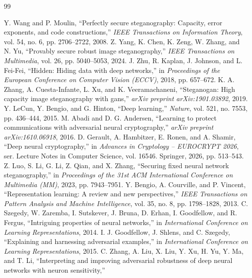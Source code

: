 \documentclass[UTF8,a4paper,zihao=-4,fontset=windows,openany]{ctexbook}
\begin{document}
\begin{thebibliography}{99}
Y. Wang and P. Moulin,
``Perfectly secure steganography: Capacity, error exponents, and code constructions,''
\emph{IEEE Transactions on Information Theory},
vol. 54, no. 6, pp. 2706--2722, 2008.
Z. Yang, K. Chen, K. Zeng, W. Zhang, and N. Yu,
``Provably secure robust image steganography,''
\emph{IEEE Transactions on Multimedia},
vol. 26, pp. 5040--5053, 2024.
J. Zhu, R. Kaplan, J. Johnson, and L. Fei-Fei,
``Hidden: Hiding data with deep networks,''
in \emph{Proceedings of the European Conference on Computer Vision (ECCV)},
2018, pp. 657--672.
K. A. Zhang, A. Cuesta-Infante, L. Xu, and K. Veeramachaneni,
``Steganogan: High capacity image steganography with gans,''
\emph{arXiv preprint arXiv:1901.03892}, 2019.
Y. LeCun, Y. Bengio, and G. Hinton,
``Deep learning,''
\emph{Nature}, vol. 521, no. 7553, pp. 436--444, 2015.
M. Abadi and D. G. Andersen,
``Learning to protect communications with adversarial neural cryptography,''
\emph{arXiv preprint arXiv:1610.06918}, 2016.
D. Gerault, A. Hambitzer, E. Ronen, and A. Shamir,
``Deep neural cryptography,''
in \emph{Advances in Cryptology -- EUROCRYPT 2026},
ser. Lecture Notes in Computer Science, vol. 16546.
Springer, 2026, pp. 513--543.
Z. Luo, S. Li, G. Li, Z. Qian, and X. Zhang,
``Securing fixed neural network steganography,''
in \emph{Proceedings of the 31st ACM International Conference on Multimedia (MM)},
2023, pp. 7943--7951.
Y. Bengio, A. Courville, and P. Vincent,
``Representation learning: A review and new perspectives,''
\emph{IEEE Transactions on Pattern Analysis and Machine Intelligence},
vol. 35, no. 8, pp. 1798--1828, 2013.
C. Szegedy, W. Zaremba, I. Sutskever, J. Bruna, D. Erhan,
I. Goodfellow, and R. Fergus,
``Intriguing properties of neural networks,''
in \emph{International Conference on Learning Representations}, 2014.
I. J. Goodfellow, J. Shlens, and C. Szegedy,
``Explaining and harnessing adversarial examples,''
in \emph{International Conference on Learning Representations}, 2015.
C. Zhang, A. Liu, X. Liu, Y. Xu, H. Yu, Y. Ma, and T. Li,
``Interpreting and improving adversarial robustness of deep neural networks with neuron sensitivity,''

\end{thebibliography}
\end{document}
